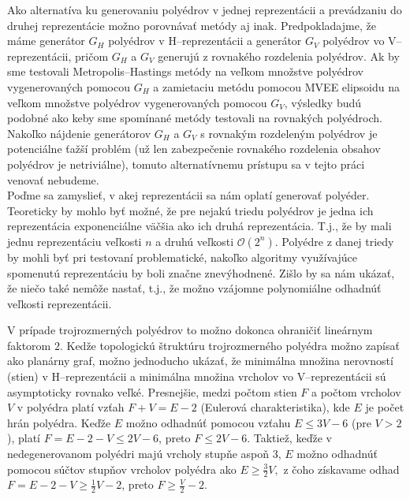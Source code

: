 Ako alternatíva ku generovaniu polyédrov v jednej reprezentácii a prevádzaniu do druhej reprezentácie možno porovnávať metódy aj inak. 
Predpokladajme, že máme generátor $G_H$ polyédrov v H--reprezentácii a generátor $G_V$ polyédrov vo V--reprezentácii, pričom $G_H$ a $G_V$ generujú z rovnakého rozdelenia polyédrov.
Ak by sme testovali Metropolis--Hastings metódy na veľkom množstve polyédrov vygenerovaných pomocou $G_H$ a zamietaciu metódu pomocou MVEE elipsoidu na veľkom množstve polyédrov vygenerovaných pomocou $G_V$, výsledky budú podobné ako keby sme spomínané metódy testovali na rovnakých polyédroch.
Nakoľko nájdenie generátorov $G_H$ a $G_V$ s rovnakým rozdeleným polyédrov je potenciálne ťažší problém (už len zabezpečenie rovnakého rozdelenia obsahov polyédrov je netriviálne), tomuto alternatívnemu prístupu sa v tejto práci venovať nebudeme.\\


Poďme sa zamyslieť, v akej reprezentácii sa nám oplatí generovať polyéder. Teoreticky by mohlo byť možné, že pre nejakú triedu polyédrov je jedna ich reprezentácia exponenciálne väčšia ako ich druhá reprezentácia. T.j., že by mali jednu reprezentáciu veľkosti $n$ a druhú veľkosti $\mathcal O(2^n)$. Polyédre z danej triedy by mohli byť pri testovaní problematické, nakoľko algoritmy využívajúce spomenutú reprezentáciu by boli značne znevýhodnené. Zišlo by sa nám ukázať, že niečo také nemôže nastať, t.j., že možno vzájomne polynomiálne odhadnúť veľkosti reprezentácii.

V prípade trojrozmerných polyédrov to možno dokonca ohraničiť lineárnym faktorom $2$. Kedže topologickú štruktúru trojrozmerného polyédra možno zapísať ako planárny graf, možno jednoducho ukázať, že minimálna množina nerovností (stien) v H--reprezentácii a minimálna množina vrcholov vo V--reprezentácii sú asymptoticky rovnako veľké.
Presnejšie, medzi počtom stien $F$ a počtom vrcholov $V$ v polyédra platí vzťah $F+V=E-2$ (Eulerová charakteristika), kde $E$ je počet hrán polyédra. Keďže $E$ možno odhadnúť pomocou vzťahu $E \le 3V-6$ (pre $V>2$), platí $F=E-2-V \leq 2V-6$, preto $F \leq 2V-6$. Taktiež, keďže v nedegenerovanom polyédri majú vrcholy stupňe aspoň $3$, $E$ možno odhadnúť pomocou súčtov stupňov vrcholov polyédra ako $E \geq \frac{3}{2}V,$ z čoho získavame odhad $F=E-2-V \geq \frac 1 2 V-2$, preto $F \geq \frac V 2 -2$.

